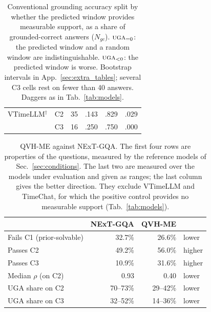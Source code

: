 \begin{table}[t]
\begin{tabular}{@{}llrrrr@{}}
VTimeLLM$^{\dagger}$ & C2 & 35 & .143 & .829 & .029 \\
                     & C3 & 16 & .250 & .750 & .000 \\
\bottomrule
\end{tabular}
\caption{Conventional grounding accuracy split by whether the predicted
window provides measurable support, as a share of grounded-correct
answers ($N_{gc}$). $\textsc{uga}_{=0}$: the predicted window and a
random window are indistinguishable. $\textsc{uga}_{<0}$: the predicted
window is worse. Bootstrap intervals in App.~\ref{sec:extra_tables};
several C3 cells rest on fewer than 40 answers. Daggers as in
Tab.~\ref{tab:models}.}
\label{tab:sga_uga}
\end{table}

\begin{table}[t]
\centering\small
\setlength{\tabcolsep}{4pt}
\begin{tabular}{@{}lrrl@{}}
\toprule
 & NExT-GQA & QVH-ME & \\
\midrule
Fails C1 (prior-solvable) & 32.7\% & 26.6\% & lower \\
Passes C2 & 49.2\% & 56.0\% & higher \\
Passes C3 & 10.9\% & 31.6\% & higher \\
Median $\rho$ (on C2) & 0.93 & 0.40 & lower \\
UGA share on C2 & 70--73\% & 29--42\% & lower \\
UGA share on C3 & 32--52\% & 14--36\% & lower \\
\bottomrule
\end{tabular}
\caption{QVH-ME against NExT-GQA. The first four rows are properties of
the questions, measured by the reference models of
Sec.~\ref{sec:conditions}. The last two are measured over the models
under evaluation and given as ranges; the last column gives the better
direction. They exclude VTimeLLM and TimeChat, for which the positive
control provides no measurable support (Tab.~\ref{tab:models}).}
\label{tab:qvh_vs_next}
\end{table}
